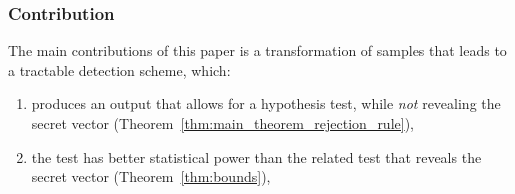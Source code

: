 \documentclass[journal, twoside, web]{ieeecolorpreprint}
\begin{document}
\subsubsection*{Contribution}
The main contributions of this paper is a transformation of samples that leads to a tractable detection scheme, which:
\begin{enumerate}
    \item \label{point:consistent} produces an output that allows for a hypothesis test, while \emph{not} revealing the secret vector (Theorem~\ref{thm:main_theorem_rejection_rule}),
    \item \label{point:better_properties} the test has better statistical power than the related test that reveals the secret vector (Theorem~\ref{thm:bounds}),
\end{enumerate}
\end{document}
